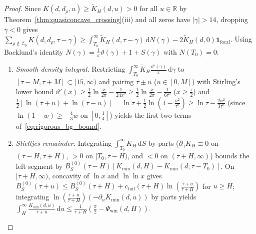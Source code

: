 \documentclass[11pt,reqno]{amsart}
\theoremstyle{definition}
\theoremstyle{remark}
\numberwithin{equation}{section}
\newcommand{\R}{\mathbb{R}}
\newcommand{\dd}{\mathrm{d}}
\begin{document}
\begin{proof}
Since $K(d, d_\rho, u) \ge \widetilde{K}_H(d, u) > 0$ for all $u \in \R$ by Theorem~\ref{thm:quasiconcave_crossing}(iii) and all zeros have $\lvert\gamma\rvert > 14$, dropping $\gamma < 0$ gives $\sum_{\rho \notin \mathcal{Z}_0} K(d, d_\rho, \tau - \gamma) \ge \int_{T_0}^{\infty} \widetilde{K}_H(d, \tau - \gamma)\,\dd N(\gamma) - 2\widetilde{K}_H(d,0)\mathbf{1}_{\mathrm{focal}}$. Using Backlund's identity $N(\gamma) = \frac{1}{\pi}\vartheta(\gamma) + 1 + S(\gamma)$ with $N(T_0) = 0$:
\begin{enumerate}[label=\textup{(\arabic*)},leftmargin=2.0em]
\item \textit{Smooth density integral.} Restricting $\int_{T_0}^{\infty} \widetilde{K}_H\frac{\vartheta'(\gamma)}{\pi}\,\dd\gamma$ to $[\tau - M, \tau + M] \subset [15, \infty)$ and pairing $\tau \pm u$ ($u \in [0, M]$) with Stirling's lower bound $\vartheta'(x) \ge \frac{1}{2}\ln\frac{x}{2\pi} - \frac{1}{24x^2} \ge \frac{1}{2}\ln\frac{x}{2\pi} - \frac{1}{6\tau^2}$ ($x \ge \frac{\tau}{2}$) and $\frac{1}{2}[\ln(\tau+u) + \ln(\tau-u)] = \ln\tau + \frac{1}{2}\ln(1 - \frac{u^2}{\tau^2}) \ge \ln\tau - \frac{2u^2}{3\tau^2}$ (since $\ln(1-w) \ge -\frac{4}{3}w$ on $[0, \frac{1}{4}]$) yields the first two terms of~\eqref{eq:rigorous_bg_bound}.
\item \textit{Stieltjes remainder.} Integrating $\int_{T_0}^{\infty} \widetilde{K}_H\,\dd S$ by parts ($\partial_\gamma\widetilde{K}_H \equiv 0$ on $(\tau-H, \tau+H)$, $> 0$ on $[T_0, \tau-H)$, and $< 0$ on $(\tau+H, \infty)$) bounds the left segment by $B_S^{(0)}(\tau-H)[K_{\min}(d,H) - K_{\min}(d,\tau-T_0)]$. On $[\tau+H, \infty)$, concavity of $\ln x$ and $\ln\ln x$ gives $B_S^{(0)}(\tau+u) \le B_S^{(0)}(\tau+H) + c_{\mathrm{tail}}(\tau+H)\ln(\frac{\tau+u}{\tau+H})$ for $u \ge H$; integrating $\ln(\frac{\tau+u}{\tau+H})(-\partial_u K_{\min}(d,u))$ by parts yields $\int_H^{\infty} \frac{K_{\min}(d,u)}{\tau+u}\,\dd u \le \frac{1}{\tau+H}(\frac{\pi}{2} - \Psi_{\mathrm{win}}(d,H))$.\qedhere
\end{enumerate}
\end{proof}
\end{document}
